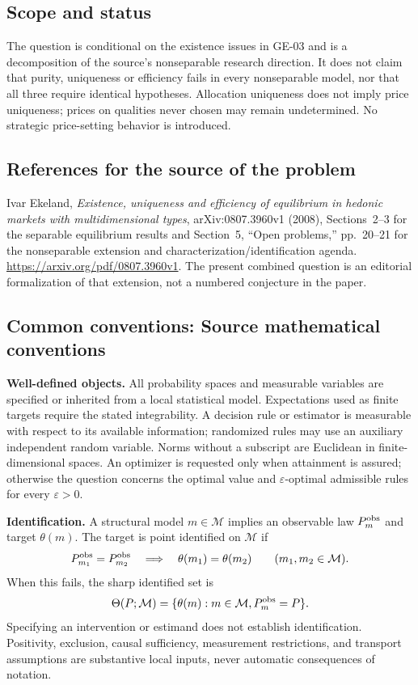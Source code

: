 \documentclass[11pt,a4paper]{article}
\begin{document}
\subsection*{Scope and status}
The question is conditional on the existence issues in GE-03 and is a decomposition of the source's nonseparable research direction. It does not claim that purity, uniqueness or efficiency fails in every nonseparable model, nor that all three require identical hypotheses. Allocation uniqueness does not imply price uniqueness; prices on qualities never chosen may remain undetermined. No strategic price-setting behavior is introduced.
\subsection*{References for the source of the problem}
Ivar Ekeland, \emph{Existence, uniqueness and efficiency of equilibrium in hedonic markets with multidimensional types}, arXiv:0807.3960v1 (2008), Sections~2--3 for the separable equilibrium results and Section~5, ``Open problems,'' pp.~20--21 for the nonseparable extension and characterization/identification agenda. \url{https://arxiv.org/pdf/0807.3960v1}. The present combined question is an editorial formalization of that extension, not a numbered conjecture in the paper.

\subsection*{Common conventions: Source mathematical conventions}

\textbf{Well-defined objects.}
All probability spaces and measurable variables are specified or inherited
from a local statistical model. Expectations used as finite targets require
the stated integrability. A decision rule or estimator is measurable with
respect to its available information; randomized rules may use an auxiliary
independent random variable. Norms without a subscript are Euclidean in
finite-dimensional spaces. An optimizer is requested only when attainment
is assured; otherwise the question concerns the optimal value and
$\varepsilon$-optimal admissible rules for every $\varepsilon>0$.

\textbf{Identification.}
A structural model $m\in\mathcal M$ implies an observable law
$P_m^{\rm obs}$ and target $\theta(m)$. The target is point identified on
$\mathcal M$ if
\[
 P_{m_1}^{\rm obs}=P_{m_2}^{\rm obs}
 \quad\Longrightarrow\quad\theta(m_1)=\theta(m_2)
 \qquad(m_1,m_2\in\mathcal M).
\]
When this fails, the sharp identified set is
\[
 \Theta(P;\mathcal M)=\{\theta(m):m\in\mathcal M,
                                  P_m^{\rm obs}=P\}.
\]
Specifying an intervention or estimand does not establish identification.
Positivity, exclusion, causal sufficiency, measurement restrictions, and
transport assumptions are substantive local inputs, never automatic
consequences of notation.
\end{document}
